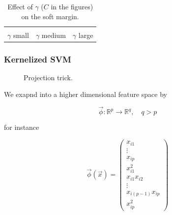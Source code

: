 \begin{table}[H]
    \centering
    \begin{tabular}{c|c|c}
         &  &  \\
        $\gamma$ small & $\gamma$ medium & $\gamma$ large
    \end{tabular}
    \caption{Effect of $\gamma$ ($C$ in the figures) on the soft margin.}
    \label{tab:svm_gamma}
\end{table}

\subsubsection{Kernelized SVM}


\begin{figure}[!htb]
    \centering
    
    \caption{Projection trick.}
    \label{fig:projection_trick}
\end{figure}


We exapnd into a higher dimensional feature space by

\begin{equation}
    \vec{\phi} : \mathbb{R}^p \rightarrow \mathbb{R}^q, \quad q > p
\end{equation}

for instance

\begin{equation}
    \vec{\phi}(\vec{x}) = \begin{pmatrix}
    x_{i1} \\ \vdots \\ x_{ip} \\ x_{i1}^2 \\ x_{i1}x_{i2} \\ \vdots \\ x_{i(p-1)}x_{ip} \\ x_{ip}^2
    \end{pmatrix}
\end{equation}

